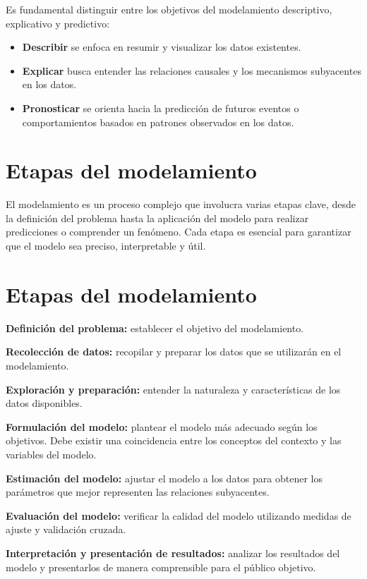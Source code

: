 \documentclass[
  letterpaper,
  DIV=11,
  numbers=noendperiod]{scrreprt}
\providecommand{\tightlist}{%
  \setlength{\itemsep}{0pt}\setlength{\parskip}{0pt}}\usepackage{longtable,booktabs,array}
\begin{document}
Es fundamental distinguir entre los objetivos del modelamiento
descriptivo, explicativo y predictivo:

\begin{itemize}
\tightlist
\item
  \textbf{Describir} se enfoca en resumir y visualizar los datos
  existentes.
\item
  \textbf{Explicar} busca entender las relaciones causales y los
  mecanismos subyacentes en los datos.
\item
  \textbf{Pronosticar} se orienta hacia la predicción de futuros eventos
  o comportamientos basados en patrones observados en los datos.
\end{itemize}

\section{Etapas del modelamiento}\label{etapas-del-modelamiento}

El modelamiento es un proceso complejo que involucra varias etapas
clave, desde la definición del problema hasta la aplicación del modelo
para realizar predicciones o comprender un fenómeno. Cada etapa es
esencial para garantizar que el modelo sea preciso, interpretable y
útil.

\section{Etapas del modelamiento}\label{etapas-del-modelamiento-1}

\textbf{Definición del problema:} establecer el objetivo del
modelamiento.

\textbf{Recolección de datos:} recopilar y preparar los datos que se
utilizarán en el modelamiento.

\textbf{Exploración y preparación:} entender la naturaleza y
características de los datos disponibles.

\textbf{Formulación del modelo:} plantear el modelo más adecuado según
los objetivos. Debe existir una coincidencia entre los conceptos del
contexto y las variables del modelo.

\textbf{Estimación del modelo:} ajustar el modelo a los datos para
obtener los parámetros que mejor representen las relaciones subyacentes.

\textbf{Evaluación del modelo:} verificar la calidad del modelo
utilizando medidas de ajuste y validación cruzada.

\textbf{Interpretación y presentación de resultados:} analizar los
resultados del modelo y presentarlos de manera comprensible para el
público objetivo.
\end{document}

